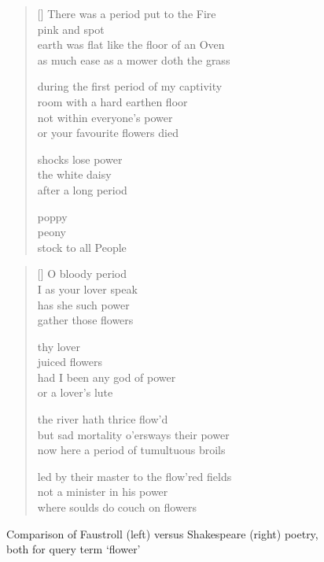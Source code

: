 \begin{figure}[!htbp]
\centering
\begin{minipage}{.45\linewidth}
  \settowidth{\versewidth}{earth was flat like the floor of an Oven}
  \begin{verse}[\versewidth]\sffamily\footnotesize
    There was a period put to the Fire\\
    pink and spot\\
    earth was flat like the floor of an Oven\\
    as much ease as a mower doth the grass

    during the first period of my captivity\\
    room with a hard earthen floor\\
    not within everyone's power\\
    or your favourite flowers died

    shocks lose power\\
    the white daisy\\
    after a long period

    poppy\\
    peony\\
    stock to all People
  \end{verse}
\end{minipage}
\hspace{.02\linewidth}
\begin{minipage}{.45\linewidth}
  \settowidth{\versewidth}{led by their master to the flow'red fields}
  \begin{verse}[\versewidth]\sffamily\footnotesize
    O bloody period\\
    I as your lover speak\\
    has she such power\\
    gather those flowers

    thy lover\\
    juiced flowers\\
    had I been any god of power\\
    or a lover's lute

    the river hath thrice flow'd\\
    but sad mortality o'ersways their power\\
    now here a period of tumultuous broils

    led by their master to the flow'red fields\\
    not a minister in his power\\
    where soulds do couch on flowers
  \end{verse}
\end{minipage}
\caption[Faustroll vs. Shakespeare poetry]{Comparison of Faustroll (left) versus Shakespeare (right) poetry, both for query term `flower'}
\label{fig:2poems}
\end{figure}

